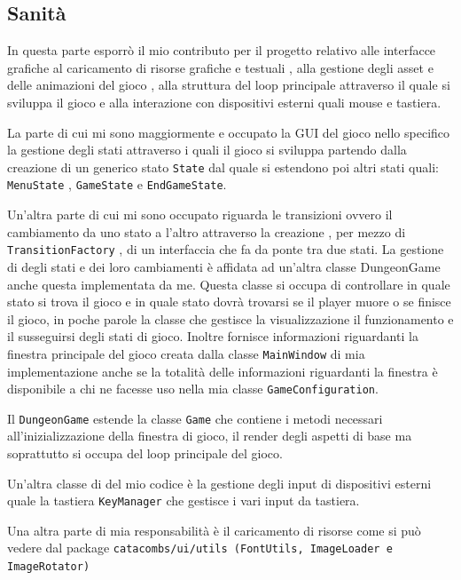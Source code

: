 \documentclass[a4paper,12pt]{report}
\begin{document}
    \subsection{Sanità}
    \par In questa parte esporrò il mio contributo per il progetto relativo alle interfacce grafiche al caricamento di risorse grafiche
    e testuali , alla gestione degli asset e delle animazioni del gioco , alla struttura del loop principale attraverso il quale si
    sviluppa il gioco e alla interazione con dispositivi esterni quali mouse e tastiera.
    \par La parte di cui mi sono maggiormente e occupato la GUI del gioco nello specifico la gestione degli stati attraverso i quali
    il gioco si sviluppa partendo dalla creazione di un generico stato \texttt{State} dal quale si estendono poi altri stati quali:
    \texttt{MenuState} , \texttt{GameState} e \texttt{EndGameState}.
    \par Un’altra parte di cui mi sono occupato riguarda le transizioni ovvero il cambiamento da uno stato a l’altro attraverso la creazione
    , per mezzo di  \texttt{TransitionFactory} , di un interfaccia che fa da ponte tra due stati. La gestione di degli stati e dei loro
    cambiamenti è affidata ad un'altra classe DungeonGame anche questa implementata da me. Questa classe si occupa di controllare
    in quale stato si trova il gioco e in quale stato dovrà trovarsi se il player muore o se finisce il gioco, in poche parole la
    classe che gestisce la visualizzazione il funzionamento e il susseguirsi degli stati di gioco. Inoltre fornisce informazioni
    riguardanti la finestra principale del gioco creata dalla classe \texttt{MainWindow} di mia implementazione anche se la totalità delle
    informazioni riguardanti la finestra è disponibile a chi  ne facesse uso nella mia classe \texttt{GameConfiguration}.
    \par Il \texttt{DungeonGame} estende la classe \texttt{Game} che contiene i metodi necessari all’inizializzazione della finestra di gioco,
    il render degli aspetti di base ma soprattutto si occupa del loop principale del gioco.
    \par Un’altra classe di del mio codice è la gestione degli input di dispositivi esterni quale la tastiera \texttt{KeyManager} che
    gestisce i vari input da tastiera.
    \par Una altra parte di mia responsabilità è il caricamento di risorse come si può vedere dal package \texttt{catacombs/ui/utils (FontUtils, ImageLoader e ImageRotator)}
\end{document}
